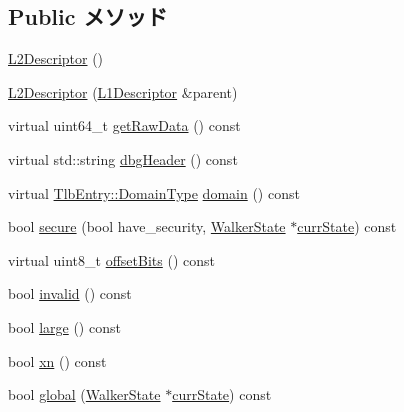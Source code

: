 \subsection*{Public メソッド}
\begin{DoxyCompactItemize}
\item 
\hyperlink{classArmISA_1_1TableWalker_1_1L2Descriptor_a9d780c55ac9abb29760291c822a3673c}{L2Descriptor} ()
\item 
\hyperlink{classArmISA_1_1TableWalker_1_1L2Descriptor_a64a173da628a256ff6b12362d2071fe8}{L2Descriptor} (\hyperlink{classArmISA_1_1TableWalker_1_1L1Descriptor}{L1Descriptor} \&parent)
\item 
virtual uint64\_\-t \hyperlink{classArmISA_1_1TableWalker_1_1L2Descriptor_a22438a8aab2360360239d433b2f8fc50}{getRawData} () const 
\item 
virtual std::string \hyperlink{classArmISA_1_1TableWalker_1_1L2Descriptor_ac7721f9b49eadf35e0a9f7715a346dbe}{dbgHeader} () const 
\item 
virtual \hyperlink{structArmISA_1_1TlbEntry_a0595b41cfb7d03f18438f9c355a3469d}{TlbEntry::DomainType} \hyperlink{classArmISA_1_1TableWalker_1_1L2Descriptor_a37c4e606592a36c252f287c3399a6fb4}{domain} () const 
\item 
bool \hyperlink{classArmISA_1_1TableWalker_1_1L2Descriptor_a183500f0404847b8d9ea66ef3cba6ca5}{secure} (bool have\_\-security, \hyperlink{classArmISA_1_1TableWalker_1_1WalkerState}{WalkerState} $\ast$\hyperlink{classArmISA_1_1TableWalker_a5d1a85a0248e318a8191d54988c8782d}{currState}) const 
\item 
virtual uint8\_\-t \hyperlink{classArmISA_1_1TableWalker_1_1L2Descriptor_ad075c68f96598f36f78db5fbfc3ed339}{offsetBits} () const 
\item 
bool \hyperlink{classArmISA_1_1TableWalker_1_1L2Descriptor_a93deb127eda8dffa42203f689ecc97ca}{invalid} () const 
\item 
bool \hyperlink{classArmISA_1_1TableWalker_1_1L2Descriptor_a86309d83af0e564a714ddb4ef9ca92cc}{large} () const 
\item 
bool \hyperlink{classArmISA_1_1TableWalker_1_1L2Descriptor_a88a5985b2a6224e7b546fa088b101d66}{xn} () const 
\item 
bool \hyperlink{classArmISA_1_1TableWalker_1_1L2Descriptor_ad6798ebc36be05efa22b3fb9f3702d83}{global} (\hyperlink{classArmISA_1_1TableWalker_1_1WalkerState}{WalkerState} $\ast$\hyperlink{classArmISA_1_1TableWalker_a5d1a85a0248e318a8191d54988c8782d}{currState}) const 
\item 

\end{DoxyCompactItemize}
